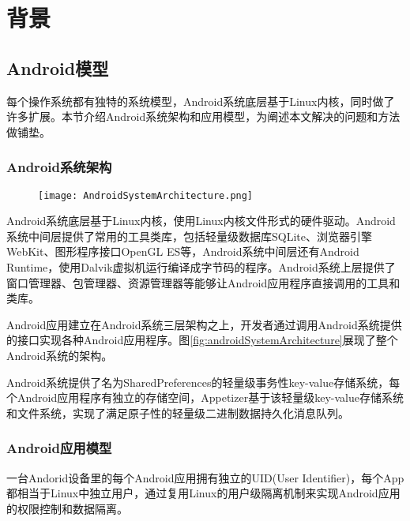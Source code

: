 
\chapter{背景}
\label{chap:background}

\section{Android模型}
\label{sec:androidModel}

每个操作系统都有独特的系统模型，Android系统底层基于Linux内核，同时做了许多扩展。本节介绍Android系统架构和应用模型，为阐述本文解决的问题和方法做铺垫。

\subsection{Android系统架构}

\begin{figure}[!htp]
	\centering
	\texttt{[image: AndroidSystemArchitecture.png]}
\end{figure}

Android系统底层基于Linux内核，使用Linux内核文件形式的硬件驱动。Android系统中间层提供了常用的工具类库，包括轻量级数据库SQLite、浏览器引擎WebKit、图形程序接口OpenGL ES等，Android系统中间层还有Android Runtime，使用Dalvik虚拟机运行编译成字节码的程序。Android系统上层提供了窗口管理器、包管理器、资源管理器等能够让Android应用程序直接调用的工具和类库。

Android应用建立在Android系统三层架构之上，开发者通过调用Android系统提供的接口实现各种Android应用程序。图\ref{fig:androidSystemArchitecture}展现了整个Android系统的架构。

Android系统提供了名为SharedPreferences的轻量级事务性key-value存储系统，每个Android应用程序有独立的存储空间，Appetizer基于该轻量级key-value存储系统和文件系统，实现了满足原子性的轻量级二进制数据持久化消息队列。

\subsection{Android应用模型}

一台Andorid设备里的每个Android应用拥有独立的UID(User Identifier)，每个App都相当于Linux中独立用户，通过复用Linux的用户级隔离机制来实现Android应用的权限控制和数据隔离。

